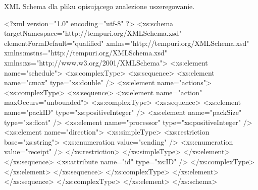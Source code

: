 \begin{listing}
\caption{XML Schema dla pliku opisującego znalezione uszeregowanie.}
\begin{codeblock}
<?xml version="1.0" encoding="utf-8" ?>
<xs:schema targetNamespace="http://tempuri.org/XMLSchema.xsd"
elementFormDefault="qualified"
xmlns="http://tempuri.org/XMLSchema.xsd"
xmlns:mstns="http://tempuri.org/XMLSchema.xsd"
xmlns:xs="http://www.w3.org/2001/XMLSchema">
<xs:element name="schedule">
<xs:complexType>
<xs:sequence>
<xs:element name="cmax" type="xs:double" />
<xs:element name="actions">
<xs:complexType>
<xs:sequence>
<xs:element name="action" maxOccurs="unbounded">
<xs:complexType>
<xs:sequence>
<xs:element name="packID" type="xs:positiveInteger" />
<xs:element name="packSize" type="xs:float" />
<xs:element name="processor" type="xs:positiveInteger" />
<xs:element name="direction">
<xs:simpleType>
<xs:restriction base="xs:string">
<xs:enumeration value="sending" />
<xs:enumeration value="receipt" />
</xs:restriction>
</xs:simpleType>
</xs:element>
</xs:sequence>
<xs:attribute name="id" type="xs:ID" />
</xs:complexType>
</xs:element>
</xs:sequence>
</xs:complexType>
</xs:element>
</xs:sequence>
</xs:complexType>
</xs:element>
</xs:schema>
\end{codeblock}
\end{listing}
